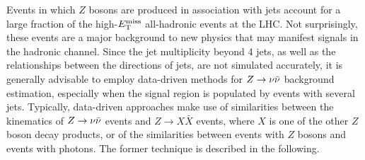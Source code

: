 Events in which $Z$ bosons are produced in association with jets account for a large fraction of the high-$E_{\text{T}}^{\rm miss}$ all-hadronic events at the LHC. Not surprisingly, these events are a major background to new physics that may manifest signals in the hadronic channel. Since the jet multiplicity beyond 4 jets, as well as the relationships between the directions of jets, are not simulated accurately, it is generally advisable to employ data-driven methods for $Z\rightarrow \nu\bar{\nu}$ background estimation, especially when the signal region is populated by events with several jets. Typically, data-driven approaches make use of similarities between the kinematics of $Z\rightarrow \nu\bar{\nu}$ events and $Z\rightarrow X\bar{X}$ events, where $X$ is one of the other $Z$ boson decay products, or of the similarities between events with $Z$ bosons and events with photons. The former technique is described in the following.

